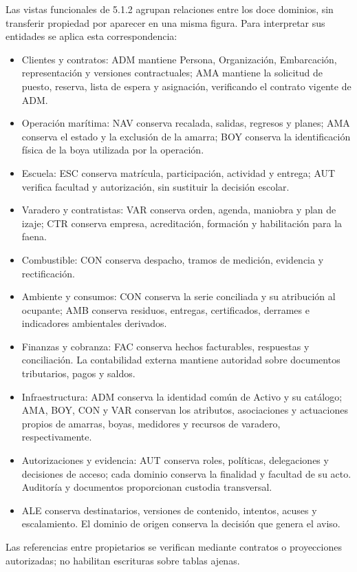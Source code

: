 Las vistas funcionales de 5.1.2 agrupan relaciones entre los doce dominios, sin transferir propiedad por aparecer en una misma figura. Para interpretar sus entidades se aplica esta correspondencia:
\begin{itemize}
\item Clientes y contratos: ADM mantiene Persona, Organización, Embarcación, representación y versiones contractuales; AMA mantiene la solicitud de puesto, reserva, lista de espera y asignación, verificando el contrato vigente de ADM.
\item Operación marítima: NAV conserva recalada, salidas, regresos y planes; AMA conserva el estado y la exclusión de la amarra; BOY conserva la identificación física de la boya utilizada por la operación.
\item Escuela: ESC conserva matrícula, participación, actividad y entrega; AUT verifica facultad y autorización, sin sustituir la decisión escolar.
\item Varadero y contratistas: VAR conserva orden, agenda, maniobra y plan de izaje; CTR conserva empresa, acreditación, formación y habilitación para la faena.
\item Combustible: CON conserva despacho, tramos de medición, evidencia y rectificación.
\item Ambiente y consumos: CON conserva la serie conciliada y su atribución al ocupante; AMB conserva residuos, entregas, certificados, derrames e indicadores ambientales derivados.
\item Finanzas y cobranza: FAC conserva hechos facturables, respuestas y conciliación. La contabilidad externa mantiene autoridad sobre documentos tributarios, pagos y saldos.
\item Infraestructura: ADM conserva la identidad común de Activo y su catálogo; AMA, BOY, CON y VAR conservan los atributos, asociaciones y actuaciones propios de amarras, boyas, medidores y recursos de varadero, respectivamente.
\item Autorizaciones y evidencia: AUT conserva roles, políticas, delegaciones y decisiones de acceso; cada dominio conserva la finalidad y facultad de su acto. Auditoría y documentos proporcionan custodia transversal.
\item ALE conserva destinatarios, versiones de contenido, intentos, acuses y escalamiento. El dominio de origen conserva la decisión que genera el aviso.
\end{itemize}
Las referencias entre propietarios se verifican mediante contratos o proyecciones autorizadas; no habilitan escrituras sobre tablas ajenas.


